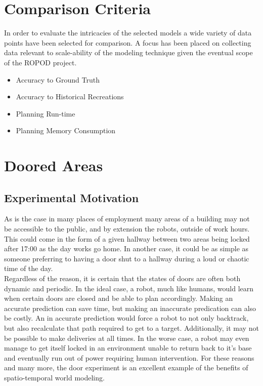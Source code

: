   \section{ Comparison Criteria }
  In order to evaluate the intricacies of the selected models a wide variety of
  data points have been selected for comparison. A focus has been placed on collecting
  data relevant to scale-ability of the modeling technique given the eventual scope of the ROPOD project.

  \begin{itemize}

    \item Accuracy to Ground Truth

    \item Accuracy to Historical Recreations

    \item Planning Run-time

    \item Planning Memory Consumption

  \end{itemize}


  \section{ Doored Areas}

  \subsection{ Experimental Motivation }

  As is the case in many places of employment many areas of a building may not
  be accessible to the public, and by extension the robots, outside of work
  hours.  This could come in the form of a given hallway between two areas being
  locked after 17:00 as the day works go home. In another case, it could be as
  simple as someone preferring to having a door shut to a hallway during a loud
  or chaotic time of the day. \\

  Regardless of the reason, it is certain that the states of doors are often
  both dynamic and periodic. In the ideal case, a robot, much like humans,
  would learn when certain doors are closed and be able to plan accordingly.
  Making an accurate prediction can save time, but making an inaccurate
  predication can also be costly. An in accurate prediction would force a robot
  to not only backtrack, but also recalculate that path required to get to a
  target. Additionally, it may not be possible to make deliveries at all times.
  In the worse case, a robot may even manage to get itself locked in an
  environment unable to return back to it's base and eventually run out of power
  requiring human intervention. For these reasons and many more, the door
  experiment is an excellent example of the benefits of spatio-temporal world
  modeling. \\

